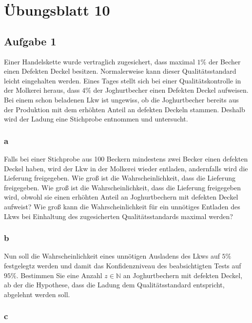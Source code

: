 \chapter{Übungsblatt 10}

\section{Aufgabe 1}

Einer Handelskette wurde vertraglich zugesichert, dass maximal $1\%$ der Becher einen Defekten Deckel besitzen. Normalerweise kann dieser Qualitätsstandard leicht eingehalten werden. Eines Tages stellt sich bei einer Qualitätskontrolle in der Molkerei heraus, dass $4\%$ der Joghurtbecher einen Defekten Deckel aufweisen. Bei einem schon beladenen Lkw ist ungewiss, ob die Joghurtbecher bereits aus der Produktion mit dem erhöhten Anteil an defekten Deckeln stammen. Deshalb wird der Ladung eine Stichprobe entnommen und untersucht.

\subsection{a}

Falls bei einer Stichprobe aus 100 Beckern mindestens zwei Becker einen defekten Deckel haben, wird der Lkw in der Molkerei wieder entladen, andernfalls wird die Lieferung freigegeben. Wie groß ist die Wahrscheinlichkeit, dass die Lieferung freigegeben. Wie groß ist die Wahrscheinlichkeit, dass die Lieferung freigegeben wird, obwohl sie einen erhöhten Anteil an Joghurtbechern mit defekten Deckel aufweist? Wie groß kann die Wahrscheinlichkeit für ein unnötiges Entladen des Lkws bei Einhaltung des zugesicherten Qualitätsstandards maximal werden?

\subsection{b}

Nun soll die Wahrscheinlichkeit eines unnötigen Ausladens des Lkws auf $5\%$ festgelegtz werden und damit das Konfidenzniveau des beabsichtigten Tests auf $95\%$. Bestimmen Sie eine Anzahl $z \in \mathbb{N}$ an Joghurtbechern mit defekten Deckel, ab der die Hypothese, dass die Ladung dem Qualitätsstandard entspricht, abgelehnt werden soll.

\subsection{c}

